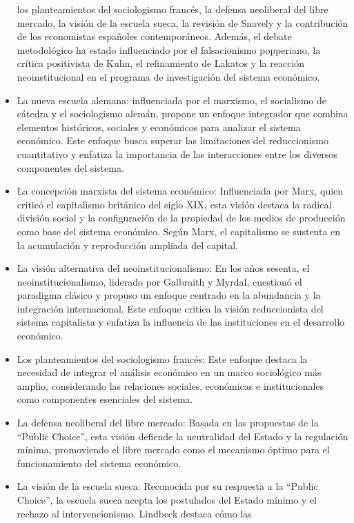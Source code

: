 \documentclass[12pt]{report} %
\begin{document}
\begin{itemize}
  los planteamientos del sociologismo francés, la defensa neoliberal del
  libre mercado, la visión de la escuela sueca, la revisión de Snavely y
  la contribución de los economistas españoles contemporáneos. Además,
  el debate metodológico ha estado influenciado por el falsacionismo
  popperiano, la crítica positivista de Kuhn, el refinamiento de Lakatos
  y la reacción neoinstitucional en el programa de investigación del
  sistema económico.
\item
  La nueva escuela alemana: influenciada por el marxismo, el socialismo
  de cátedra y el sociologismo alemán, propone un enfoque integrador que
  combina elementos históricos, sociales y económicos para analizar el
  sistema económico. Este enfoque busca superar las limitaciones del
  reduccionismo cuantitativo y enfatiza la importancia de las
  interacciones entre los diversos componentes del sistema.
\item
  La concepción marxista del sistema económico: Influenciada por Marx,
  quien criticó el capitalismo británico del siglo XIX, esta visión
  destaca la radical división social y la configuración de la propiedad
  de los medios de producción como base del sistema económico. Según
  Marx, el capitalismo se sustenta en la acumulación y reproducción
  ampliada del capital.
\item
  La visión alternativa del neoinstitucionalismo: En los años sesenta,
  el neoinstitucionalismo, liderado por Galbraith y Myrdal, cuestionó el
  paradigma clásico y propuso un enfoque centrado en la abundancia y la
  integración internacional. Este enfoque critica la visión
  reduccionista del sistema capitalista y enfatiza la influencia de las
  instituciones en el desarrollo económico.
\item
  Los planteamientos del sociologismo francés: Este enfoque destaca la
  necesidad de integrar el análisis económico en un marco sociológico
  más amplio, considerando las relaciones sociales, económicas e
  institucionales como componentes esenciales del sistema.
\item
  La defensa neoliberal del libre mercado: Basada en las propuestas de
  la ``Public Choice'', esta visión defiende la neutralidad del Estado y
  la regulación mínima, promoviendo el libre mercado como el mecanismo
  óptimo para el funcionamiento del sistema económico.
\item
  La visión de la escuela sueca: Reconocida por su respuesta a la
  ``Public Choice'', la escuela sueca acepta los postulados del Estado
  mínimo y el rechazo al intervencionismo. Lindbeck destaca cómo las

\end{itemize}
\end{document}
